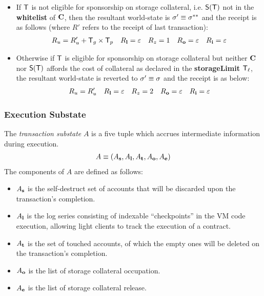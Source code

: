 \begin{itemize}
	\item If ${\textsf{T}}$ is not eligible for sponsorship on storage collateral,
	i.e. $\mathsf{S}{\left({\textsf{T}} \right)}$ not in the {\bf whitelist} of $\mathbf{C}$,
	then the resultant world-state is $\mathbf{\sigma}'\equiv\mathbf{\sigma}^{**}$
	and the receipt is as follows (where $R'$ refers to the receipt of last transaction):
	\begin{align}
		R_u=R'_u+\textsf{T}_g\times\textsf{T}_p && R_{\bf l}=\mathbb{\varepsilon} && R_z=1 && R_{\bf o}=\mathbb{\varepsilon} && R_{\bf i}=\mathbb{\varepsilon}
	\end{align}

	\item 
	Otherwise if $\textsf{T}$ is eligible for sponsorship on storage collateral but neither $\mathbf{C}$ nor $\mathsf{S}{\left({\textsf{T}} \right)}$ affords the cost of collateral as declared in the {\bf storageLimit} $\textsf{T}_\ell$,
	the resultant world-state is reverted to $\mathbf{\sigma}'\equiv\mathbf{\sigma}$ and the receipt is as below:
	\begin{align}
		R_u=R'_u && R_{\bf l}=\mathbb{\varepsilon} && R_z=2 && R_{\bf o}=\mathbb{\varepsilon} && R_{\bf i}=\mathbb{\varepsilon}
	\end{align}
\end{itemize}
%




\subsubsection{Execution Substate}
\label{subsubsec:substate}

The \emph{transaction substate} $A$ is a five tuple which accrues intermediate information during execution. 
\begin{align}
	A\equiv \left( A_{\bf s}, A_{\bf l}, A_{\bf t}, A_{\bf o}, A_{\bf e}\right)
\end{align}
The components of $A$ are defined as follows: 
\begin{itemize}[nosep]
	\item $A_{\bf s}$ is the self-destruct set of accounts that will be discarded upon the transaction's completion.

	\item $A_{\bf l}$ is the log series consisting of indexable ``checkpoints'' in the VM code execution, allowing light clients to track the execution of a contract.

	\item $A_{\bf t}$ is the set of touched accounts, of which the empty ones will be deleted on the transaction's completion.

	\item $A_{\bf o}$ is the list of storage collateral occupation.
	
	\item $A_{\bf e}$ is the list of storage collateral release.
\end{itemize}

